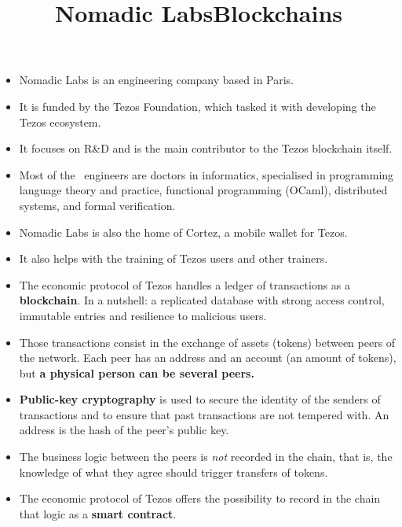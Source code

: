 \documentclass[wide]{slides}
\begin{document}
\begin{slide}
  \title{Nomadic Labs}

  \begin{itemize}

    \item Nomadic Labs is an engineering company based in Paris.

    \item It is funded by the Tezos Foundation, which tasked it with
      developing the Tezos ecosystem.

    \item It focuses on R\&D and is the main contributor to the Tezos
      blockchain itself.

    \item Most of the ~engineers are doctors in
      informatics, specialised in programming language theory and
      practice, functional programming (OCaml), distributed systems,
      and formal verification.

    \item Nomadic Labs is also the home of Cortez, a mobile wallet for
      Tezos.

    \item It also helps with the training of Tezos users and other
      trainers.

  \end{itemize}

\end{slide}

\begin{slide}
  \title{Blockchains}

  \begin{itemize}

    \item The economic protocol of Tezos handles a ledger of
      transactions as a \textbf{blockchain}. In a nutshell: a
      replicated database with strong access control, immutable
      entries and resilience to malicious users.

    \item Those transactions consist in the exchange of assets
      (tokens) between peers of the network. Each peer has an address
      and an account (an amount of tokens), but \textbf{a physical
        person can be several peers.}

    \item \textbf{Public-key cryptography} is used to secure the
      identity of the senders of transactions and to ensure that past
      transactions are not tempered with. An address is the hash of
      the peer's public key.

    \item The business logic between the peers is \emph{not} recorded
      in the chain, that is, the knowledge of what they agree should
      trigger transfers of tokens.

    \item The economic protocol of Tezos offers the possibility to
      record in the chain that logic as a \textbf{smart contract}.

  \end{itemize}

\end{slide}
\end{document}
